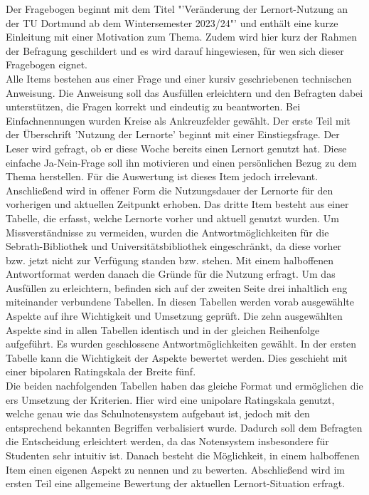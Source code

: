 \documentclass[11pt, a4paper]{article}
\begin{document}
Der Fragebogen beginnt mit dem Titel "'Veränderung der Lernort-Nutzung an der TU Dortmund ab dem Wintersemester 2023/24"' und enthält eine kurze Einleitung mit einer Motivation zum Thema. Zudem wird hier kurz der Rahmen der Befragung geschildert und es wird darauf hingewiesen, für wen sich dieser Fragebogen eignet.\\
Alle Items bestehen aus einer Frage und einer kursiv geschriebenen technischen Anweisung. Die Anweisung soll das Ausfüllen erleichtern und den Befragten dabei unterstützen, die Fragen korrekt und eindeutig zu beantworten. Bei Einfachnennungen wurden Kreise als Ankreuzfelder gewählt.
Der erste Teil mit der Überschrift 'Nutzung der Lernorte' beginnt mit einer Einstiegsfrage.
Der Leser wird gefragt, ob er diese Woche bereits einen Lernort genutzt hat. Diese einfache Ja-Nein-Frage soll ihn motivieren und einen persönlichen Bezug zu dem Thema herstellen. Für die Auswertung ist dieses Item jedoch irrelevant.\\
Anschließend wird in offener Form die Nutzungsdauer der Lernorte für den vorherigen und aktuellen Zeitpunkt erhoben. Das dritte Item besteht aus einer Tabelle, die erfasst, welche Lernorte vorher und aktuell genutzt wurden.
Um Missverständnisse zu vermeiden, wurden die Antwortmöglichkeiten für die Sebrath-Bibliothek und Universitätsbibliothek eingeschränkt, da diese vorher bzw. jetzt nicht zur Verfügung standen bzw. stehen.
Mit einem halboffenen Antwortformat werden danach die Gründe für die Nutzung erfragt.
Um das Ausfüllen zu erleichtern, befinden sich auf der zweiten Seite drei inhaltlich eng miteinander verbundene Tabellen. In diesen Tabellen werden vorab ausgewählte Aspekte auf ihre Wichtigkeit und Umsetzung geprüft. Die zehn ausgewählten Aspekte sind in allen Tabellen identisch und  in der gleichen Reihenfolge aufgeführt. Es wurden geschlossene Antwortmöglichkeiten gewählt.
In der ersten Tabelle kann die Wichtigkeit der Aspekte bewertet werden. Dies geschieht mit einer bipolaren Ratingskala der Breite fünf.\\
Die beiden nachfolgenden Tabellen haben das gleiche Format und ermöglichen die  ers Umsetzung der Kriterien. Hier wird eine unipolare Ratingskala genutzt, welche genau wie das Schulnotensystem aufgebaut ist, jedoch
mit den entsprechend bekannten Begriffen verbalisiert wurde.
Dadurch soll dem Befragten die Entscheidung erleichtert werden, da das Notensystem insbesondere für Studenten sehr intuitiv ist. 
Danach besteht die Möglichkeit, in einem halboffenen Item einen eigenen Aspekt zu nennen und zu bewerten.
Abschließend wird im ersten Teil eine allgemeine Bewertung der aktuellen Lernort-Situation erfragt.
\end{document}
